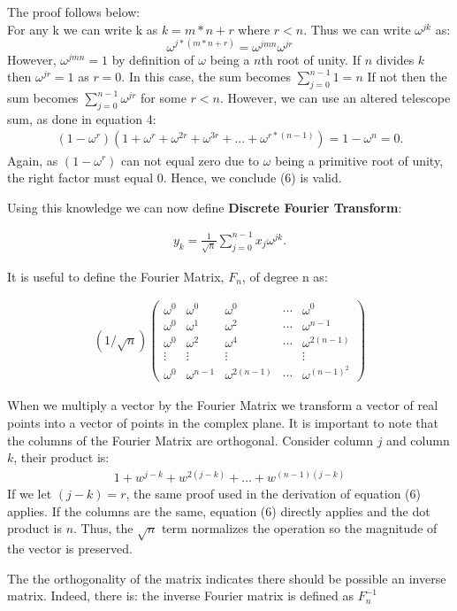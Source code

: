\documentclass[DIV=calc, paper=a4, fontsize=11pt, twocolumn]{scrartcl}   %
\begin{document}
The proof follows below: \\

For any k we can write k as $k = m*n +r $ where $r < n$. Thus we can write $\omega^{jk}$ as: $$\omega^{j*(m*n+r)} = \omega^{jmn}\omega^{jr} $$ However, $\omega^{jmn}=1$ by definition of $\omega$ being a $n$th root of unity. If $n$ divides $k$ then $\omega^{jr} = 1$ as $r=0$. In this case, the sum becomes $\sum_{j=0}^{n-1}1=n$ If not then the sum becomes $\sum_{j=0}^{n-1}\omega^{jr}$ for some $r<n$. However, we can use an altered telescope sum, as done in equation 4:
\begin{align}
(1 - \omega^r)(1 + \omega^r + \omega^{2r} + \omega^{3r} + ... + \omega^{r*(n-1)}) = 1 - \omega^n = 0.
\end{align}
Again, as $(1 - \omega^r)$ can not equal zero due to $\omega$ being a primitive root of unity, the right factor must equal 0. Hence, we conclude (6) is valid.


\par Using this knowledge we can now define \textbf{Discrete Fourier Transform}:

\begin{align}
y_k = \frac{1}{\sqrt{n}}\sum_{j=0}^{n-1}x_j\omega^{jk}.
\end{align}

It is useful to define the Fourier Matrix, $F_{n}$, of degree n as:

\begin{align}
 (1/\sqrt n)
 \begin{pmatrix}
  \omega^0 & \omega^0 & \omega^0 & \cdots & \omega^0 \\
  \omega^0  & \omega^1 & \omega^2 &  \cdots &  \omega^{n-1} \\
   \omega^0  & \omega^2 & \omega^4 &  \cdots &  \omega^{2(n-1)} \\
  \vdots  & \vdots  & \vdots &   & \vdots  \\
  \omega^0  & \omega^{n-1} & \omega^{2(n-1)} & \cdots & \omega^{{(n-1)}^2}
 \end{pmatrix}
\end{align}

When we multiply a vector by the Fourier Matrix we transform a vector of real points into a vector of points in the complex plane. It is important to note that the columns of the Fourier Matrix are orthogonal. Consider column $j$ and column $k$, their product is:
\begin{align}
1 + w^{j-k} +w^{2(j-k)}+...+w^{(n-1)(j-k)}
\end{align}
If we let $(j-k) = r$, the same proof used in the derivation of equation (6) applies. If the columns are the same, equation (6) directly applies and the dot product is $n$. Thus, the $\sqrt{n}$ term normalizes the operation so the magnitude of the vector is preserved.
\par The the orthogonality of the matrix indicates there should be possible an inverse matrix. Indeed, there is: the inverse Fourier matrix is defined as $F_{n}^{-1}$
\end{document}
